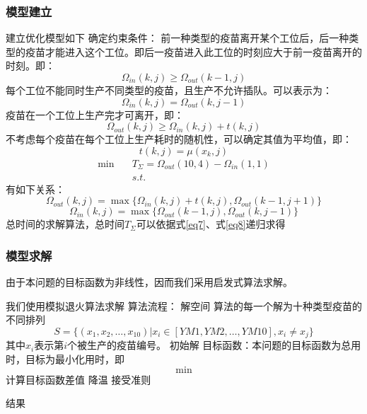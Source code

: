 \documentclass[UTF8]{ctexart}
\begin{document}
	\subsubsection{模型建立}
	建立优化模型如下
	确定约束条件：
	前一种类型的疫苗离开某个工位后，后一种类型的疫苗才能进入这个工位。即后一疫苗进入此工位的时刻应大于前一疫苗离开的时刻。即：
	\begin{equation}
		\Omega_{in}(k,j)\geqslant\Omega_{out}(k-1,j)
	\end{equation}
	每个工位不能同时生产不同类型的疫苗，且生产不允许插队。可以表示为：
	\begin{equation}
		\Omega_{in}(k,j)=\Omega_{out}(k,j-1)
	\end{equation}
	疫苗在一个工位上生产完才可离开，即：
	\begin{equation}
		\Omega_{out}(k,j)\geqslant\Omega_{in}(k,j)+t(k,j)
	\end{equation}
	不考虑每个疫苗在每个工位上生产耗时的随机性，可以确定其值为平均值，即：
	\begin{equation}
		t(k,j)=\mu(x_{k},j)
	\end{equation}
	\begin{equation}
		\begin{split}
		\min \quad&T_{\Sigma}=\Omega_{out}(10,4)-\Omega_{in}(1,1)\\
		&s.t. 
		\end{split}
	\end{equation}
	有如下关系：
	\begin{equation}
		\Omega_{out}(k,j)=\max\{\Omega_{in}(k,j)+t(k,j),\Omega_{out}(k-1,j+1)\}
		\label{eq7}
	\end{equation}
	\begin{equation}
		\Omega_{in}(k,j)=\max\{\Omega_{out}(k-1,j),\Omega_{out}(k,j-1)\}
		\label{eq8}
	\end{equation}
	总时间的求解算法，总时间$T_{\Sigma}$可以依据式\ref{eq7}、式\ref{eq8}递归求得
	\subsubsection{模型求解}
	由于本问题的目标函数为非线性，因而我们采用启发式算法求解。
	\par 我们使用模拟退火算法求解
	算法流程：
	解空间
	算法的每一个解为十种类型疫苗的不同排列
	\begin{equation}
		S=\{(x_1,x_2,\dots,x_{10})|x_{i}\in[YM1,YM2,\dots,YM10],x_{i}\neq x_{j}\}
	\end{equation}
	其中$x_{i}$表示第$i$个被生产的疫苗编号。
	初始解
	目标函数：本问题的目标函数为总用时，目标为最小化用时，即
	\begin{equation}
		\min
	\end{equation}
	计算目标函数差值
	降温
	接受准则
	\par 结果
\end{document}
